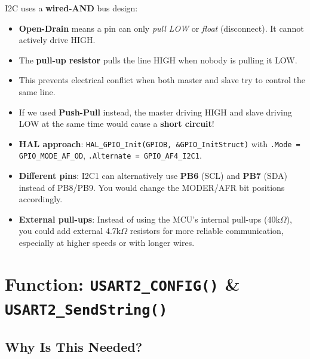 \documentclass[12pt, a4paper]{article}
\begin{document}
\begin{warnbox}
I2C uses a \textbf{wired-AND} bus design:
\begin{itemize}[leftmargin=1.5em]
    \item \textbf{Open-Drain} means a pin can only \textit{pull LOW} or \textit{float} (disconnect). It cannot actively drive HIGH.
    \item The \textbf{pull-up resistor} pulls the line HIGH when nobody is pulling it LOW.
    \item This prevents electrical conflict when both master and slave try to control the same line.
    \item If we used \textbf{Push-Pull} instead, the master driving HIGH and slave driving LOW at the same time would cause a \textbf{short circuit}!
\end{itemize}
\end{warnbox}

\begin{altbox}
\begin{itemize}[leftmargin=1.5em]
    \item \textbf{HAL approach}: \texttt{HAL\_GPIO\_Init(GPIOB, \&GPIO\_InitStruct)} with \texttt{.Mode = GPIO\_MODE\_AF\_OD}, \texttt{.Alternate = GPIO\_AF4\_I2C1}.
    \item \textbf{Different pins}: I2C1 can alternatively use \textbf{PB6} (SCL) and \textbf{PB7} (SDA) instead of PB8/PB9. You would change the MODER/AFR bit positions accordingly.
    \item \textbf{External pull-ups}: Instead of using the MCU's internal pull-ups (\texttildelow40k$\Omega$), you could add external 4.7k$\Omega$ resistors for more reliable communication, especially at higher speeds or with longer wires.
\end{itemize}
\end{altbox}

\section{Function: \texttt{USART2\_CONFIG()} \& \texttt{USART2\_SendString()}}

\subsection{Why Is This Needed?}
\end{document}
